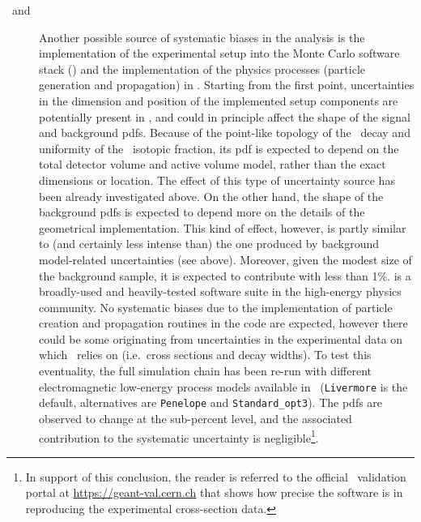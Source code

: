 \begin{description}

  \item[\mage\ and \geant{}] Another possible source of systematic biases in the analysis
    is the implementation of the experimental setup into the Monte Carlo software stack
    (\mage) and the implementation of the physics processes (particle generation and
    propagation) in \geant. Starting from the first point, uncertainties in the dimension
    and position of the implemented setup components are potentially present in \mage, and
    could in principle affect the shape of the signal and background pdfs. Because of the
    point-like topology of the \nnbb\ decay and uniformity of the \gesix\ isotopic
    fraction, its pdf is expected to depend on the total detector volume and active volume
    model, rather than the exact dimensions or location. The effect of this type of
    uncertainty source has been already investigated above. On the other hand, the shape
    of the background pdfs is expected to depend more on the details of the geometrical
    implementation. This kind of effect, however, is partly similar to (and certainly less
    intense than) the one produced by background model-related uncertainties (see above).
    Moreover, given the modest size of the background sample, it is expected to contribute
    with less than 1\%.
    \newpar
    \geant{} is a broadly-used and heavily-tested software suite in the high-energy
    physics community. No systematic biases due to the implementation of particle creation
    and propagation routines in the code are expected, however there could be some
    originating from uncertainties in the experimental data on which \geant\ relies on
    (i.e.~cross sections and decay widths). To test this eventuality, the full simulation
    chain has been re-run with different electromagnetic low-energy process models
    available in \geant\ (\texttt{Livermore} is the default, alternatives are
    \texttt{Penelope} and \texttt{Standard\_opt3}). The pdfs are observed to change at the
    sub-percent level, and the associated contribution to the systematic uncertainty is
    negligible\footnote{%
      In support of this conclusion, the reader is referred to the official \geant\
      validation portal at \url{https://geant-val.cern.ch} that shows how precise the
      software is in reproducing the experimental cross-section data. 
    }.


\end{description}
